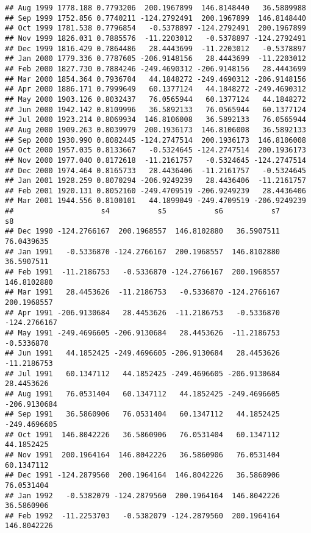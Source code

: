 \documentclass[]{article}
\begin{document}
\begin{verbatim}
## Aug 1999 1778.188 0.7793206  200.1967899  146.8148440   36.5809988
## Sep 1999 1752.856 0.7740211 -124.2792491  200.1967899  146.8148440
## Oct 1999 1781.538 0.7796854   -0.5378897 -124.2792491  200.1967899
## Nov 1999 1826.031 0.7885576  -11.2203012   -0.5378897 -124.2792491
## Dec 1999 1816.429 0.7864486   28.4443699  -11.2203012   -0.5378897
## Jan 2000 1779.336 0.7787605 -206.9148156   28.4443699  -11.2203012
## Feb 2000 1827.730 0.7884246 -249.4690312 -206.9148156   28.4443699
## Mar 2000 1854.364 0.7936704   44.1848272 -249.4690312 -206.9148156
## Apr 2000 1886.171 0.7999649   60.1377124   44.1848272 -249.4690312
## May 2000 1903.126 0.8032437   76.0565944   60.1377124   44.1848272
## Jun 2000 1942.142 0.8109996   36.5892133   76.0565944   60.1377124
## Jul 2000 1923.214 0.8069934  146.8106008   36.5892133   76.0565944
## Aug 2000 1909.263 0.8039979  200.1936173  146.8106008   36.5892133
## Sep 2000 1930.990 0.8082445 -124.2747514  200.1936173  146.8106008
## Oct 2000 1957.035 0.8133667   -0.5324645 -124.2747514  200.1936173
## Nov 2000 1977.040 0.8172618  -11.2161757   -0.5324645 -124.2747514
## Dec 2000 1974.464 0.8165733   28.4436406  -11.2161757   -0.5324645
## Jan 2001 1928.259 0.8070294 -206.9249239   28.4436406  -11.2161757
## Feb 2001 1920.131 0.8052160 -249.4709519 -206.9249239   28.4436406
## Mar 2001 1944.556 0.8100101   44.1899049 -249.4709519 -206.9249239
##                    s4           s5           s6           s7           s8
## Dec 1990 -124.2766167  200.1968557  146.8102880   36.5907511   76.0439635
## Jan 1991   -0.5336870 -124.2766167  200.1968557  146.8102880   36.5907511
## Feb 1991  -11.2186753   -0.5336870 -124.2766167  200.1968557  146.8102880
## Mar 1991   28.4453626  -11.2186753   -0.5336870 -124.2766167  200.1968557
## Apr 1991 -206.9130684   28.4453626  -11.2186753   -0.5336870 -124.2766167
## May 1991 -249.4696605 -206.9130684   28.4453626  -11.2186753   -0.5336870
## Jun 1991   44.1852425 -249.4696605 -206.9130684   28.4453626  -11.2186753
## Jul 1991   60.1347112   44.1852425 -249.4696605 -206.9130684   28.4453626
## Aug 1991   76.0531404   60.1347112   44.1852425 -249.4696605 -206.9130684
## Sep 1991   36.5860906   76.0531404   60.1347112   44.1852425 -249.4696605
## Oct 1991  146.8042226   36.5860906   76.0531404   60.1347112   44.1852425
## Nov 1991  200.1964164  146.8042226   36.5860906   76.0531404   60.1347112
## Dec 1991 -124.2879560  200.1964164  146.8042226   36.5860906   76.0531404
## Jan 1992   -0.5382079 -124.2879560  200.1964164  146.8042226   36.5860906
## Feb 1992  -11.2253703   -0.5382079 -124.2879560  200.1964164  146.8042226

\end{verbatim}
\end{document}
